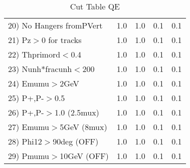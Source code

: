 \begin{table}[h!]
\begin{tabular}{||l||r|r|r|r||}
 20) No Hangers fromPVert &         1.0 &         1.0 &         0.1 &         0.1 \\
 21) Pz$>$0 for tracks    &         1.0 &         1.0 &         0.1 &         0.1 \\
 22) Thprimord$<$0.4      &         1.0 &         1.0 &         0.1 &         0.1 \\
 23) Nunh*fracunh$<$200   &         1.0 &         1.0 &         0.1 &         0.1 \\
 24) Emumu$>$2GeV         &         1.0 &         1.0 &         0.1 &         0.1 \\
 25) P+,P-$>$0.5          &         1.0 &         1.0 &         0.1 &         0.1 \\
 26) P+,P-$>$1.0 (2.5mux) &         1.0 &         1.0 &         0.1 &         0.1 \\
 27) Emumu$>$5GeV  (8mux) &         1.0 &         1.0 &         0.1 &         0.1 \\
 28) Phi12$>$90deg  (OFF) &         1.0 &         1.0 &         0.1 &         0.1 \\
 29) Pmumu$>$10GeV  (OFF) &         1.0 &         1.0 &         0.1 &         0.1 \\
 \hline
 \hline
 \end{tabular}
 \caption{Cut Table  QE     }
 \label{tab-cut____qe}
 \end{table}
